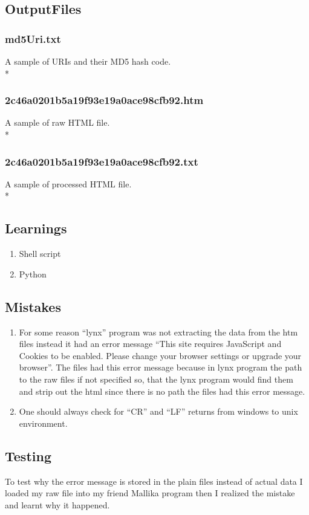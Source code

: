 \documentclass[12pt]{article}
\begin{document}
\subsection{OutputFiles}
\subsubsection{md5Uri.txt}
A sample of URIs and their MD5 hash code.\\*

\subsubsection{2c46a0201b5a19f93e19a0ace98cfb92.htm}
A sample of raw HTML file.\\*

\newpage
\subsubsection{2c46a0201b5a19f93e19a0ace98cfb92.txt}
A sample of processed HTML file.\\*

\subsection{Learnings}
\begin{enumerate}
	\item Shell script
	\item Python
\end{enumerate}
\subsection{Mistakes}
\begin{enumerate}
	\item For some reason ``lynx'' program was not extracting the data from the htm files instead it had an error message ``This site requires JavaScript and Cookies to be enabled. Please change your browser settings or upgrade your browser''. The files had this error message because in lynx program the path to the raw files if not specified so, that the lynx program would find them and strip out the html since there is no path the files had this error message.
	\item One should always check for ``CR'' and ``LF'' returns from windows to unix environment. 
\end{enumerate}
\subsection{Testing}
To test why the error message is stored in the plain files instead of actual data I loaded my raw file into my friend Mallika program then I realized the mistake and learnt why it happened.
\newpage
\end{document}

